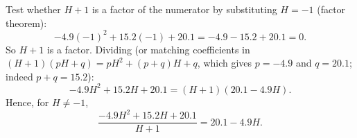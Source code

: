 Test whether $H+1$ is a factor of the numerator by substituting $H=-1$ (factor theorem):
\[
-4.9(-1)^2+15.2(-1)+20.1=-4.9-15.2+20.1=0 .
\]
So $H+1$ is a factor. Dividing (or matching coefficients in $(H+1)(pH+q)=pH^2+(p+q)H+q$, which gives $p=-4.9$ and $q=20.1$; indeed $p+q=15.2$):
\[
-4.9H^2+15.2H+20.1=(H+1)(20.1-4.9H).
\]
Hence, for $H\ne-1$,
\[
\dfrac{-4.9H^2+15.2H+20.1}{H+1}=\boxed{20.1-4.9H}.
\]
